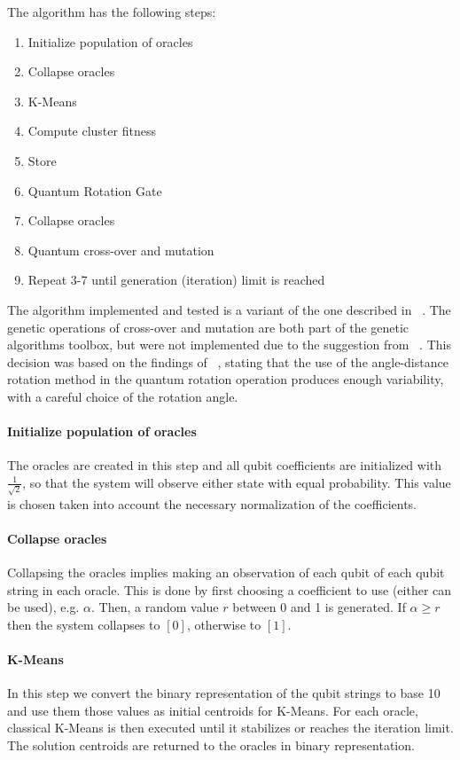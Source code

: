 The algorithm has the following steps:
\begin{enumerate}
\item Initialize population of oracles
\item Collapse oracles
\item K-Means
\item Compute cluster fitness
\item Store
\item Quantum Rotation Gate
\item Collapse oracles
\item Quantum cross-over and mutation
\item Repeat 3-7 until generation (iteration) limit is reached
\end{enumerate}



The algorithm implemented and tested is a variant of the one described in ~\cite{Casper}. The genetic operations of cross-over and mutation are both part of the genetic algorithms toolbox, but were not implemented due to the suggestion from ~\cite{Wiebe2014}. This decision was based on the findings of ~\cite{Liu2010}, stating that the use of the angle-distance rotation method in the quantum rotation operation produces enough variability, with a careful choice of the rotation angle.

\paragraph{Initialize population of oracles}

The oracles are created in this step and all qubit coefficients are initialized with $\frac{1}{\sqrt{2}}$, so that the system will observe either state with equal probability. This value is chosen taken into account the necessary normalization of the coefficients.

\paragraph{Collapse oracles}

Collapsing the oracles implies making an observation of each qubit of each qubit string in each oracle. This is done by first choosing a coefficient to use (either can be used), e.g. $\alpha$. Then, a random value $r$ between 0 and 1 is generated. If $\alpha \ge r$ then the system collapses to $[0]$, otherwise to $[1]$.

\paragraph{K-Means}
In this step we convert the binary representation of the qubit strings to base 10 and use them those values as initial centroids for K-Means. For each oracle, classical K-Means is then executed until it stabilizes or reaches the iteration limit. The solution centroids are returned to the oracles in binary representation.

